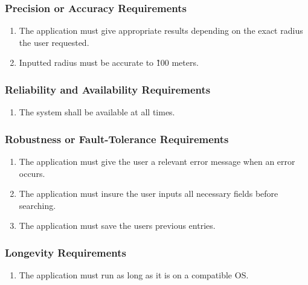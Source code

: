\documentclass[english]{article}
\begin{document}
\subsubsection{Precision or Accuracy Requirements}
\label{ssub:precision_or_accuracy_requirements}
\begin{enumerate}[{PAR}1. ]
\item The application must give appropriate results depending on the exact radius the user requested.

\item Inputted radius must be accurate to \~100 meters.
\end{enumerate}

\subsubsection{Reliability and Availability Requirements}
\label{ssub:reliability_and_availability_requirements}
\begin{enumerate}[{RAR}1. ]
\item The system shall be available at all times.
\end{enumerate}

\subsubsection{Robustness or Fault-Tolerance Requirements}
\label{ssub:robustness_or_fault_tolerance_requirements}
\begin{enumerate}[{RFR}1. ]
\item The application must give the user a relevant error message when an error occurs.

\item The application must insure the user inputs all necessary fields before searching.

\item The application must save the users previous entries.

\end{enumerate}

\subsubsection{Longevity Requirements}
\label{ssub:longevity_requirements}
\begin{enumerate}[{LONGR}1. ]
\item The application must run as long as it is on a compatible OS.
\end{enumerate}
\end{document}
